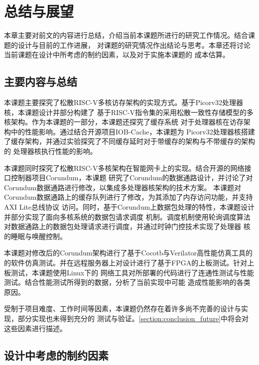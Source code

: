 \section{总结与展望}

本章主要对前文的内容进行总结，介绍当前本课题所进行的研究工作情况。结合课题的设计与目前的工作进展，
对课题的研究情况作出结论与思考。本章还将讨论当前课题在设计中所考虑的制约因素，以及对于实施本课题的
成本估算。

\subsection{主要内容与总结}

本课题主要探究了松散RISC-V多核访存架构的实现方式。基于Picorv32处理器核，本课题设计并部分构建了
基于RISC-V指令集的采用松散一致性存储模型的多核架构。作为本课题的一部分，本课题还探究了缓存系统
对于处理器核在访存架构中的性能影响。通过结合开源项目IOB-Cache\cite{roque2021iob}，本课题为
Picorv32处理器核搭建了缓存架构，并通过实验探究了不同缓存延时对于带缓存的架构与不带缓存的架构的
处理器核执行性能的影响。

本课题同时探究了松散RISC-V多核架构在智能网卡上的实现。结合开源的网络接口控制器项目Corundum\cite{forencich2020corundum}，本课题
研究了Corundum的数据通路设计，并讨论了对Corundum数据通路进行修改，以集成多处理器核架构的技术方案。
本课题对Corundum数据通路上的缓存队列进行了修改，为其添加了内存访问功能，并支持AXI Lite总线协议
访问。同时，基于Corundum上数据包处理的特性，本课题设计并部分实现了面向多核系统的数据包请求调度
机制。调度机制使用轮询调度算法对数据通路上的数据包处理请求进行调度，并通过时钟门控技术实现了处理器
核的睡眠与唤醒控制。

本课题对修改后的Corundum架构进行了基于Cocotb\cite{cocotb_doc}与Verilator\cite{verilator_website}高性能仿真工具的
的软件仿真测试。并在远程服务器上对设计进行了基于FPGA的上板测试。针对上板测试，本课题使用Linux下的
网络工具对所部署的代码进行了连通性测试与性能测试。结合性能测试所得到的数据，分析了当前实现中可能
造成性能影响的各类原因。

受制于项目难度、工作时间等因素，本课题仍然存在着许多尚不完善的设计与实现，部分实现也未得到充分的
测试与验证。\autoref{section:conclusion_future}中将会对这些因素进行描述。

\subsection{设计中考虑的制约因素}


